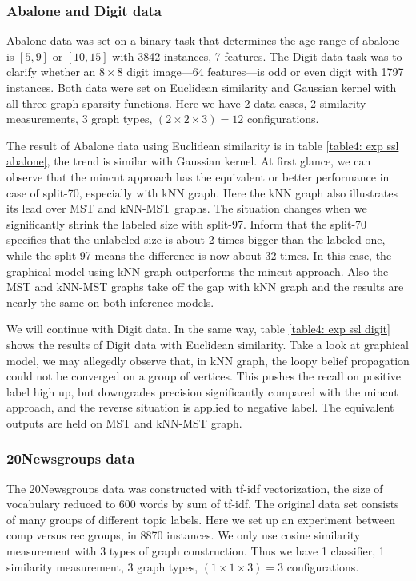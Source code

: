 \subsubsection*{Abalone and Digit data}
Abalone data was set on a binary task that determines the age range of abalone is $[5, 9]$ or $[10, 15]$ with 3842 instances, 7 features. The Digit data task was to clarify whether an $8\times8$ digit image---64 features---is odd or even digit with 1797 instances. Both data were set on Euclidean similarity and Gaussian kernel with all three graph sparsity functions. Here we have 2 data cases, 2 similarity measurements, 3 graph types, $(2 \times 2 \times 3) = 12$ configurations. 

The result of Abalone data using Euclidean similarity is in table \ref{table4: exp ssl abalone}, the trend is similar with Gaussian kernel. At first glance, we can observe that the mincut approach has the equivalent or better performance in case of split-70, especially with kNN graph. Here the kNN graph also illustrates its lead over MST and kNN-MST graphs. The situation changes when we significantly shrink the labeled size with split-97. Inform that the split-70 specifies that the unlabeled size is about 2 times bigger than the labeled one, while the split-97 means the difference is now about 32 times. In this case, the graphical model using kNN graph outperforms the mincut approach. Also the MST and kNN-MST graphs take off the gap with kNN graph and the results are nearly the same on both inference models.

We will continue with Digit data. In the same way, table \ref{table4: exp ssl digit} shows the results of Digit data with Euclidean similarity.  Take a look at graphical model, we may allegedly observe that, in kNN graph, the loopy belief propagation could not be converged on a group of vertices. This pushes the recall on positive label high up, but downgrades precision significantly compared with the mincut approach, and the reverse situation is applied to negative label. The equivalent outputs are held on MST and kNN-MST graph.

\subsubsection*{20Newsgroups data}
The 20Newsgroups data was constructed with tf-idf vectorization, the size of vocabulary reduced to 600 words by sum of tf-idf. The original data set consists of many groups of different topic labels. Here we set up an experiment between comp versus rec groups, in 8870 instances. We only use cosine similarity measurement with 3 types of graph construction. Thus we have 1 classifier, 1 similarity measurement, 3 graph types, $(1 \times 1 \times 3) = 3$ configurations.

